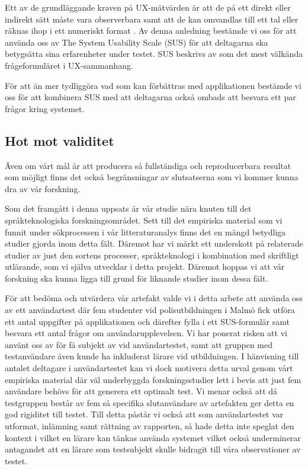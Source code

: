 \documentclass[swedish]{maucsthesis}
\begin{document}
Ett av de grundläggande kraven på UX-mätvärden är att de på ett direkt eller
indirekt sätt måste vara observerbara samt att de kan omvandlas till ett tal
eller räknas ihop i ett numeriskt format \citep{tullis:2013}. Av denna anledning
bestämde vi oss för att använda oss av The System Usability Scale (SUS) för att
deltagarna ska betygsätta sina erfarenheter under testet. SUS beskrivs av
\citep{laubheimer:2018} som det mest välkända frågeformuläret i UX-sammanhang.

För att än mer tydliggöra vad som kan förbättras med applikationen bestämde vi
oss för att kombinera SUS med att deltagarna också ombads att besvara ett par
frågor kring systemet.

\subsection{Hot mot validitet}

Även om vårt mål är att producera så fullständiga och reproducerbara resultat
som möjligt finns det också begränsningar av slutsatserna som vi kommer kunna
dra av vår forskning.

Som det framgått i denna uppsats är vår studie nära knuten till det
språkteknologiska forskningsområdet. Sett till det empiriska material som vi
funnit under sökprocessen i vår litteraturanalys finns det en mängd betydliga
studier gjorda inom detta fält. Däremot har vi märkt ett underskott på
relaterade studier av just den sortens processer, språkteknologi i kombination
med skriftligt utlärande, som vi själva utvecklar i detta projekt. Däremot
hoppas vi att vår forskning ska kunna ligga till grund för liknande studier inom
dessa fält.

För att bedöma och utvärdera vår artefakt valde vi i detta arbete att använda
oss av ett användartest där fem studenter vid polisutbildningen i Malmö fick
utföra ett antal uppgifter på applikationen och därefter fylla i ett
SUS-formulär samt besvara ett antal frågor om användarupplevelsen. Vi har
ponerat risken att vi använt oss av för få subjekt av vid användartestet, samt
att gruppen med testanvändare även kunde ha inkluderat lärare vid utbildningen.
I hänvisning till antalet deltagare i användartestet kan vi dock motivera detta
urval genom vårt empiriska material där väl underbyggda forskningsstudier lett i
bevis att just fem användare behövs för att generera ett optimalt test. Vi menar
också att då testgruppen består av fem så specifika slutanvändare av artefakten
ger detta en god rigiditet till testet. Till detta påstår vi också att som
användartestet var utformat, inlämning samt rättning av rapporten, så hade detta
inte speglat den kontext i vilket en lärare kan tänkas använda systemet vilket
också underminerar antagandet att en lärare som testsubjekt skulle bidragit till
våra observationer av testet.
\end{document}
